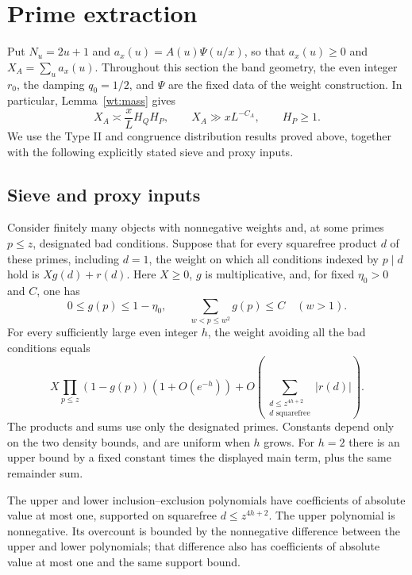 \section{Prime extraction}\label{ex:section}

Put $N_u=2u+1$ and $a_x(u)=A(u)\Psi(u/x)$, so that
$a_x(u)\ge0$ and $X_A=\sum_u a_x(u)$. Throughout this section the
band geometry, the even integer $r_0$, the damping $q_0=1/2$, and
$\Psi$ are the fixed data of the weight construction. In particular,
Lemma~\ref{wt:mass} gives
\begin{equation}\label{ex:mass-reminder}
 X_A\asymp\frac{x}{L}H_QH_P,\qquad X_A\gg xL^{-C_A},\qquad H_P\ge1.
\end{equation}
We use the Type II and congruence distribution results proved above,
together with the following explicitly stated sieve and proxy inputs.

\subsection{Sieve and proxy inputs}

\begin{lemma}\label{ex:block-sieve}
Consider finitely many objects with nonnegative weights and, at some
primes $p\le z$, designated bad conditions. Suppose that for every
squarefree product $d$ of these primes, including $d=1$, the weight
on which all conditions indexed by $p\mid d$ hold is
$Xg(d)+r(d)$. Here $X\ge0$, $g$ is multiplicative, and, for fixed
$\eta_0>0$ and $C$, one has
\[
 0\le g(p)\le1-\eta_0,\qquad
 \sum_{w<p\le w^2}g(p)\le C\quad(w>1).
\]
For every sufficiently large even integer $h$, the weight avoiding
all the bad conditions equals
\begin{equation}\label{ex:block-formula}
 X\prod_{p\le z}(1-g(p))(1+O(e^{-h}))
 +O\!\left(\sum_{\substack{d\le z^{4h+2}\\d\text{ squarefree}}}
                 |r(d)|\right).
\end{equation}
The products and sums use only the designated primes. Constants
depend only on the two density bounds, and are uniform when $h$
grows. For $h=2$ there is an upper bound by a fixed constant times
the displayed main term, plus the same remainder sum.

The upper and lower inclusion--exclusion polynomials have
coefficients of absolute value at most one, supported on squarefree
$d\le z^{4h+2}$. The upper polynomial is nonnegative. Its overcount
is bounded by the nonnegative difference between the upper and
lower polynomials; that difference also has coefficients of absolute
value at most one and the same support bound.
\end{lemma}

